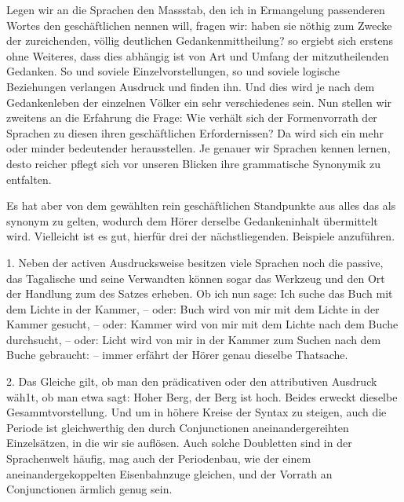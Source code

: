 \largerpage
Legen wir an die Sprachen den Massstab, den ich in Ermangelung  passenderen Wortes den geschäftlichen nennen will, fragen wir:  haben \label{sp.363} sie nöthig zum Zwecke der zureichenden, völlig deutlichen Gedankenmittheilung? so ergiebt sich erstens ohne Weiteres, dass dies abhängig ist von Art und Umfang der mitzutheilenden Gedanken. So und soviele Einzelvorstellungen, so und soviele logische Beziehungen verlangen Ausdruck und finden ihn. Und dies  wird je nach dem Gedankenleben der einzelnen Völker ein sehr verschiedenes sein. Nun stellen wir zweitens an die Erfahrung die Frage: Wie verhält sich der Formenvorrath der Sprachen zu diesen ihren geschäftlichen Erfordernissen? Da wird sich ein mehr oder minder bedeutender  herausstellen. Je genauer wir Sprachen kennen lernen, desto reicher pflegt sich vor unseren Blicken ihre grammatische Synonymik zu entfalten.

Es hat aber von dem gewählten rein geschäftlichen Standpunkte aus alles das als synonym zu gelten, wodurch dem Hörer derselbe Gedankeninhalt übermittelt wird. Vielleicht ist es gut, hierfür drei der nächstliegenden. Beispiele anzuführen.

1. Neben der activen Ausdrucksweise besitzen viele Sprachen noch die passive, das Tagalische und seine Verwandten können sogar das Werkzeug und den Ort der Handlung zum  des Satzes erheben. Ob ich nun sage: Ich suche das Buch mit dem Lichte in der Kammer, – oder:  Buch wird von mir mit dem Lichte in der Kammer gesucht, – oder:  Kammer wird von mir mit dem Lichte nach dem Buche durchsucht, – oder:  Licht wird von mir in der Kammer zum Suchen nach dem Buche gebraucht: – immer erfährt der Hörer genau dieselbe Thatsache.

2. Das Gleiche gilt, ob man den prädicativen oder den attributiven Ausdruck wäh1t, ob man etwa sagt: Hoher Berg,  der Berg ist hoch. Beides erweckt dieselbe Gesammtvorstellung. Und um in höhere Kreise der Syntax zu steigen,  auch die Periode ist gleichwerthig den durch Conjunctionen aneinandergereihten Einzelsätzen, in die wir sie auflösen. Auch solche Doubletten sind in der Sprachenwelt häufig, mag auch der Periodenbau, wie der  einem aneinandergekoppelten Eisenbahnzuge gleichen, und der Vorrath an Conjunctionen ärmlich genug sein.


